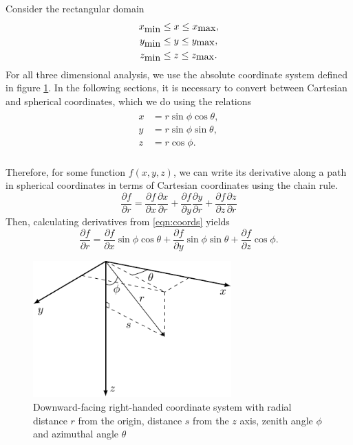 Consider the rectangular domain
\begin{align*}
  x_{\mbox{min}} &\leq x \leq x_{\mbox{max}}, \\
  y_{\mbox{min}} &\leq y \leq y_{\mbox{max}}, \\
  z_{\mbox{min}} &\leq z \leq z_{\mbox{max}}.
\end{align*}
For all three dimensional analysis, we use the absolute coordinate system defined in figure \ref{fig:3dcoords}.
In the following sections, it is necessary to convert between Cartesian and spherical coordinates, which we do using the relations
\begin{align}
	\begin{split}
		x & = r\sin\phi\cos\theta, \\
		y & = r\sin\phi\sin\theta, \\
		z & = r\cos\phi. \\
	\label{eqn:coords}
	\end{split}
\end{align}

Therefore, for some function $f(x,y,z)$, we can write its derivative along a path in spherical coordinates in terms of Cartesian coordinates using the chain rule.
\begin{equation}
	\frac{\partial f}{\partial r} 
	=\frac{\partial f}{\partial x}\frac{\partial x}{\partial r} 
	+ \frac{\partial f}{\partial y}\frac{\partial y}{\partial r} 
	+ \frac{\partial f}{\partial z}\frac{\partial z}{\partial r}
\end{equation}
Then, calculating derivatives from \eqref{eqn:coords} yields
\begin{equation}
	\frac{\partial f}{\partial r} 
	=\frac{\partial f}{\partial x}\sin\phi\cos\theta
	+ \frac{\partial f}{\partial y}\sin\phi\sin\theta
	+ \frac{\partial f}{\partial z}\cos\phi.
	\label{eqn:partials}
\end{equation}
\begin{figure}[H]
	\centering
	\includegraphics[width=3in]{3d_coords}
	\caption{Downward-facing right-handed coordinate system with radial distance $r$ from the origin, distance $s$ from the $z$ axis, zenith angle $\phi$ and azimuthal angle $\theta$}
	\label{fig:3dcoords}
\end{figure}


